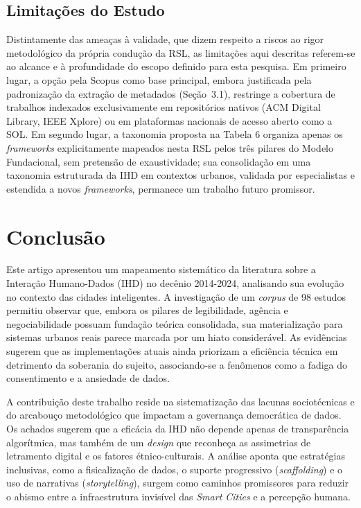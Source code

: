 \documentclass[12pt]{article}
\begin{document}
    \subsection{Limitações do Estudo}

    Distintamente das ameaças à validade, que dizem respeito a riscos ao rigor metodológico da própria condução da RSL, as limitações aqui descritas referem-se ao alcance e à profundidade do escopo definido para esta pesquisa. Em primeiro lugar, a opção pela Scopus como base principal, embora justificada pela padronização da extração de metadados (Seção~3.1), restringe a cobertura de trabalhos indexados exclusivamente em repositórios nativos (ACM Digital Library, IEEE Xplore) ou em plataformas nacionais de acesso aberto como a SOL. Em segundo lugar, a taxonomia proposta na Tabela 6 organiza apenas os \textit{frameworks} explicitamente mapeados nesta RSL pelos três pilares do Modelo Fundacional, sem pretensão de exaustividade; sua consolidação em uma taxonomia estruturada da IHD em contextos urbanos, validada por especialistas e estendida a novos \textit{frameworks}, permanece um trabalho futuro promissor.

    \section{Conclusão}

    Este artigo apresentou um mapeamento sistemático da literatura sobre a Interação Humano-Dados (IHD) no decênio 2014-2024, analisando sua evolução no contexto das cidades inteligentes. A investigação de um \textit{corpus} de 98 estudos permitiu observar que, embora os pilares de legibilidade, agência e negociabilidade possuam fundação teórica consolidada, sua materialização para sistemas urbanos reais parece marcada por um hiato considerável. As evidências sugerem que as implementações atuais ainda priorizam a eficiência técnica em detrimento da soberania do sujeito, associando-se a fenômenos como a fadiga do consentimento e a ansiedade de dados.

    A contribuição deste trabalho reside na sistematização das lacunas sociotécnicas e do arcabouço metodológico que impactam a governança democrática de dados. Os achados sugerem que a eficácia da IHD não depende apenas de transparência algorítmica, mas também de um \textit{design} que reconheça as assimetrias de letramento digital e os fatores étnico-culturais. A análise aponta que estratégias inclusivas, como a fisicalização de dados, o suporte progressivo (\textit{scaffolding}) e o uso de narrativas (\textit{storytelling}), surgem como caminhos promissores para reduzir o abismo entre a infraestrutura invisível das \textit{Smart Cities} e a percepção humana.
\end{document}
